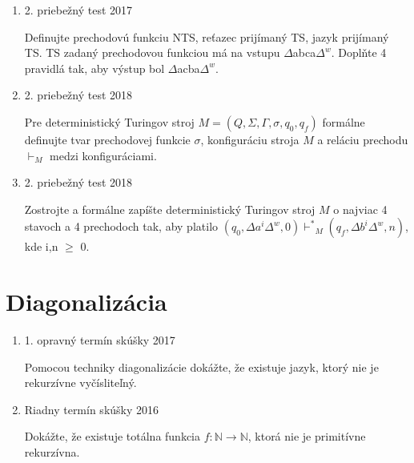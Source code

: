 \documentclass[]{article}
\begin{document}
	\begin{enumerate}
		\item 2. priebežný test 2017
		
		Definujte prechodovú funkciu NTS, reťazec prijímaný TS, jazyk prijímaný TS. TS zadaný prechodovou funkciou má na vstupu $\Delta$abca$\Delta^{w}$. Doplňte 4 pravidlá tak, aby výstup bol $\Delta$acba$\Delta^w$.
		
		\item 2. priebežný test 2018
		
		Pre deterministický Turingov stroj $M = (Q, \Sigma, \Gamma, \sigma, q_0, q_f)$ formálne definujte tvar prechodovej funkcie $\sigma$, konfiguráciu stroja $M$ a reláciu prechodu $\vdash_M$ medzi konfiguráciami.
		
		\item 2. priebežný test 2018
		
		Zostrojte a formálne zapíšte deterministický Turingov stroj $M$ o najviac 4 stavoch a 4 prechodoch tak, aby platilo $(q_0, \Delta a^i\Delta^w, 0) {\vdash^*}_M (q_f, \Delta b^i\Delta^w, n)$, kde i,n $\geq$ 0.
	\end{enumerate}

	
	\section{Diagonalizácia}
	
	\begin{enumerate}
		\item 1. opravný termín skúšky 2017
		
		Pomocou techniky diagonalizácie dokážte, že existuje jazyk, ktorý nie je rekurzívne vyčísliteľný.
		\item Riadny termín skúšky 2016
		
		Dokážte, že existuje totálna funkcia $f: \mathbb{N} \rightarrow \mathbb{N}$, ktorá nie je primitívne rekurzívna.
		
	\end{enumerate}
	
\end{document}
